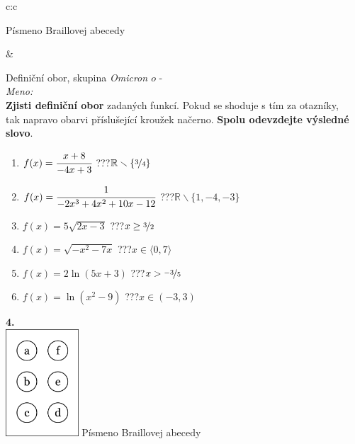 \documentclass[10pt]{report}
\newcommand\omicron{o}
\begin{document}
\begin{tabular}{c:c}
\begin{minipage}[c][99mm][t]{0.49\linewidth}
\begin{center}
\begin{minipage}{0.20\linewidth}
\begin{center}
{\small Písmeno Braillovej abecedy}
\end{center}
\end{minipage}
\end{center}
\end{minipage}
&
\begin{minipage}[c][99mm][t]{0.49\linewidth}
\begin{center}
\vspace{7mm}
{\huge Definiční obor, skupina \textit{Omicron $\omicron$} -}\\[4.5mm]
\textit{Meno:}\phantom{xxxxxxxxxxxxxxxxxxxxxxxxxxxxxxxxxxxxxxxxxxxxxxxxxxxxxxxxxxxxxxxxx}\\[3.5mm]
\textbf{Zjisti definiční obor} zadaných funkcí. Pokud se shoduje s tím za otazníky,\\tak napravo obarvi příslušející kroužek načerno. \textbf{Spolu odevzdejte výsledné slovo}.\\[3mm]
\begin{minipage}{0.77\linewidth}
\begin{center}
\begin{varwidth}{\textwidth}
\begin{enumerate}
\normalsize
\item $f(x)=\cfrac{x+8}{-4x+3}$\quad \dotfill\; ???\;\dotfill \quad $\mathbb{R}\smallsetminus\{\nicefrac{3}{4}\}$
\item $f(x)=\cfrac{1}{-2x^3+4x^2+10x-12}$\quad \dotfill\; ???\;\dotfill \quad $\mathbb{R}\smallsetminus\{1,-4,-3\}$
\item $f(x)=5\sqrt{2x-3}$\quad \dotfill\; ???\;\dotfill \quad $x\geq\nicefrac{3}{2}$
\item $f(x)=\sqrt{-x^2-7x}$\quad \dotfill\; ???\;\dotfill \quad $x\in\langle0 , 7\rangle$
\item $f(x)=2\ln{(5x+3)}$\quad \dotfill\; ???\;\dotfill \quad $x>\nicefrac{-3}{5}$
\item $f(x)=\ln{(x^2-9)}$\quad \dotfill\; ???\;\dotfill \quad $x\in(-3 , 3)$
\end{enumerate}
\end{varwidth}
\end{center}
\end{minipage}
\begin{minipage}{0.20\linewidth}
\begin{center}
{\Huge\bfseries 4.} \\[2mm]
\includegraphics[height=40mm]{../images/braille.png}
{\small Písmeno Braillovej abecedy}
\end{center}
\end{minipage}
\end{center}
\end{minipage}
%
\end{tabular}
\end{document}
